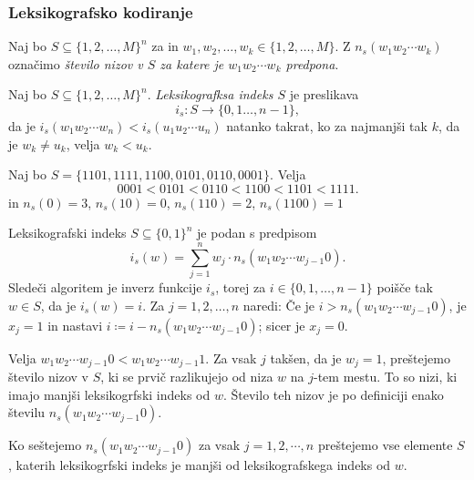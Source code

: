 \documentclass[fin1, tisk]{fmfdelo}
\theoremstyle{definition}
\begin{document}
\subsubsection{Leksikografsko kodiranje}%

\begin{definicija}
    Naj bo $S \subseteq \{ 1,2, \ldots, M\}^n$ za in $w_1, w_2, \ldots, w_k \in \{ 1,2, \ldots, M\}$. 
    Z $n_s(w_1w_2 \cdots w_k)$ označimo \emph{število nizov v $S$ za katere je $w_1w_2 \cdots w_k$ predpona}.
\end{definicija}

\begin{definicija}
    Naj bo $S \subseteq \{ 1,2, \ldots, M\}^n$. \emph{Leksikografksa indeks $S$} je preslikava
    \[
        i_s \colon S \to \{ 0,1 \ldots, n -1 \},
    \]
    da je $i_s(w_1w_2 \cdots w_n) < i_s(u_1u_2 \cdots u_n)$ natanko takrat, ko za najmanjši
    tak $k$, da je $w_k \neq u_k$, velja $w_k < u_k$.
\end{definicija}

\begin{primer}\label{primer:številčenje}
    Naj bo $S = \{ 1101, 1111, 1100, 0101, 0110, 0001 \}$. Velja
    \[
        0001 < 0101 < 0110 < 1100 < 1101 < 1111.
    \]
    in $n_s(0) = 3$, $n_s(10) = 0$, $n_s(110) = 2$, $n_s(1100) = 1$
\end{primer}

\begin{trditev}
    Leksikografski indeks $S \subseteq \{ 0,1 \}^n$ je podan s predpisom
    \[
        i_s(w) = \sum_{j=1}^{n} w_j \cdot n_s(w_1w_2 \cdots w_{j-1}0).
    \]
    Sledeči algoritem je inverz funkcije $i_s$, torej za $i \in \{ 0, 1, \ldots, n - 1 \}$ 
    poišče tak $w \in S$, da je $i_s(w) = i$. Za $j = 1, 2, \ldots, n$ naredi: Če je 
    $i > n_s(w_1w_2 \cdots w_{j-1}0)$, je $x_j = 1$ in nastavi 
    $i \coloneq  i - n_s(w_1w_2 \cdots w_{j-1}0)$; sicer je $x_j = 0$.
\end{trditev}

\begin{dokaz}
    Velja $w_1w_2 \cdots w_{j-1}0 < w_1w_2 \cdots w_{j-1}1$. Za vsak $j$ takšen, da je $w_j=1$,
    preštejemo število nizov v $S$, ki se prvič razlikujejo od niza $w$ na $j$-tem mestu.
    To so nizi, ki imajo manjši leksikogrfski indeks od $w$. Število teh nizov je po 
    definiciji enako številu $n_s(w_1w_2 \cdots w_{j-1}0)$.

    Ko seštejemo $n_s(w_1w_2 \cdots w_{j-1}0)$ za vsak $j = 1,2, \cdots, n$ preštejemo vse
    elemente $S$, katerih leksikogrfski indeks je manjši od leksikografskega indeks od $w$.
\end{dokaz}
\end{document}
